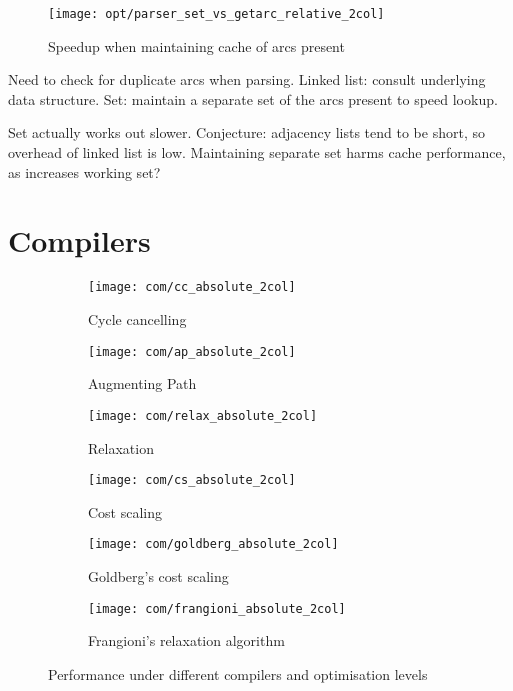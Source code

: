 \begin{figure}
    \centering
    \texttt{[image: opt/parser\_set\_vs\_getarc\_relative\_2col]}
    \caption{Speedup when maintaining cache of arcs present}
    \label{fig:opt-dimacs-parser}
\end{figure}

Need to check for duplicate arcs when parsing. Linked list: consult underlying data structure. Set: maintain a separate set of the arcs present to speed lookup.

Set actually works out slower. Conjecture: adjacency lists tend to be short, so overhead of linked list is low. Maintaining separate set harms cache performance, as increases working set?


\section{Compilers}

\begin{figure}
    \begin{widepage}
    \begin{subfigure}[c]{0.5\textwidth}
        \texttt{[image: com/cc\_absolute\_2col]}
        \caption{Cycle cancelling}
    \end{subfigure}
    \begin{subfigure}[c]{0.5\textwidth}
        \texttt{[image: com/ap\_absolute\_2col]}
        \caption{Augmenting Path}
    \end{subfigure}
    \begin{subfigure}[c]{0.5\textwidth}
        \texttt{[image: com/relax\_absolute\_2col]}
        \caption{Relaxation}
    \end{subfigure}
    \begin{subfigure}[c]{0.5\textwidth}
        \texttt{[image: com/cs\_absolute\_2col]}
        \caption{Cost scaling}
    \end{subfigure}
    \begin{subfigure}[c]{0.5\textwidth}
        \texttt{[image: com/goldberg\_absolute\_2col]}
        \caption{Goldberg's cost scaling}
    \end{subfigure}
    \begin{subfigure}[c]{0.5\textwidth}
        \texttt{[image: com/frangioni\_absolute\_2col]}
        \caption{Frangioni's relaxation algorithm}
    \end{subfigure}
    \end{widepage}
    \caption{Performance under different compilers and optimisation levels}
    \label{fig:compilers}
\end{figure}

